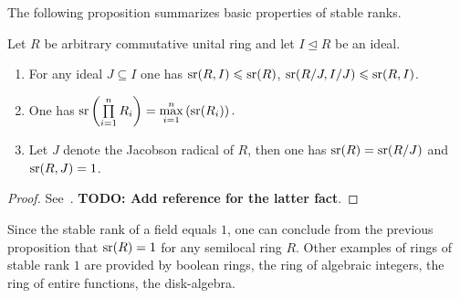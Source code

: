 The following proposition summarizes basic properties of stable ranks.
\begin{prop} \label{prop:sr_properties}
Let $R$ be arbitrary commutative unital ring and let $I\trianglelefteq R$ be an ideal.
\begin{enumerate}
\item For any ideal $J\subseteq I$ one has $\operatorname{sr}(R,I)\leqslant\operatorname{sr}(R)$, $\operatorname{sr}(R/J,I/J)\leqslant\operatorname{sr}(R,I)$.
\item One has $\operatorname{sr}\left(\prod\limits_{i=1}^n R_i\right)=\max\limits_{i=1}^n\left(\operatorname{sr}(R_i)\right).$
\item Let $J$ denote the Jacobson radical of $R$, then one has $\operatorname{sr}(R)=\operatorname{sr}(R/J)$ and $\operatorname{sr}(R, J) = 1$.
\end{enumerate}
\end{prop}
\begin{proof} See~\cite{Va71}. 
\textbf{TODO: Add reference for the latter fact}.
\end{proof}
\begin{example}
Since the stable rank of a field equals $1$, one can conclude from the previous proposition that $\operatorname{sr}(R)=1$ for any semilocal ring $R$.
Other examples of rings of stable rank $1$ are provided by boolean rings, the ring of algebraic integers, the ring of entire functions, the disk-algebra.
\end{example}


